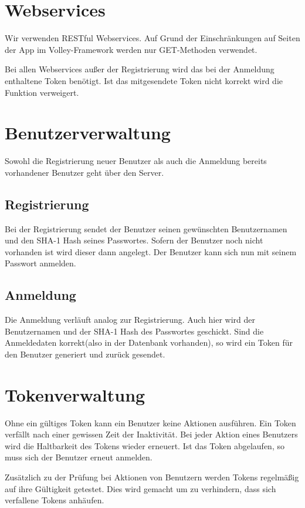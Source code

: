 \section{Webservices}
Wir verwenden RESTful Webservices. Auf Grund der Einschränkungen auf Seiten der App im Volley-Framework werden nur GET-Methoden verwendet. 

Bei allen Webservices außer der Registrierung wird das bei der Anmeldung enthaltene Token benötigt. Ist das mitgesendete Token nicht korrekt wird die Funktion verweigert.

\section{Benutzerverwaltung}
Sowohl die Registrierung neuer Benutzer als auch die Anmeldung bereits vorhandener Benutzer geht über den Server. 

\subsection{Registrierung}
Bei der Registrierung sendet der Benutzer seinen gewünschten Benutzernamen und den SHA-1 Hash seines Passwortes. Sofern der Benutzer noch nicht vorhanden ist wird dieser dann angelegt. Der Benutzer kann sich nun mit seinem Passwort anmelden.

\subsection{Anmeldung}
Die Anmeldung verläuft analog zur Registrierung. Auch hier wird der Benutzernamen und der SHA-1 Hash des Passwortes geschickt. Sind die Anmeldedaten korrekt(also in der Datenbank vorhanden), so wird ein Token für den Benutzer generiert und zurück gesendet.

\section{Tokenverwaltung}
Ohne ein gültiges Token kann ein Benutzer keine Aktionen ausführen. Ein Token verfällt nach einer gewissen Zeit der Inaktivität. Bei jeder Aktion eines Benutzers wird die Haltbarkeit des Tokens wieder erneuert. Ist das Token abgelaufen, so muss sich der Benutzer erneut anmelden.

Zusätzlich zu der Prüfung bei Aktionen von Benutzern werden Tokens regelmäßig auf ihre Gültigkeit getestet. Dies wird gemacht um zu verhindern, dass sich verfallene Tokens anhäufen.

